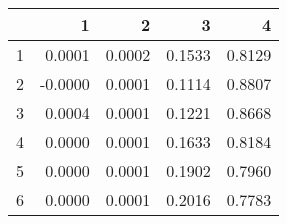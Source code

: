 \begin{table}[ht]
\begin{center}
\begin{tabular}{rrrrr}
  \hline
 & 1 & 2 & 3 & 4 \\ 
  \hline
1 & 0.0001 & 0.0002 & 0.1533 & 0.8129 \\ 
  2 & -0.0000 & 0.0001 & 0.1114 & 0.8807 \\ 
  3 & 0.0004 & 0.0001 & 0.1221 & 0.8668 \\ 
  4 & 0.0000 & 0.0001 & 0.1633 & 0.8184 \\ 
  5 & 0.0000 & 0.0001 & 0.1902 & 0.7960 \\ 
  6 & 0.0000 & 0.0001 & 0.2016 & 0.7783 \\ 
   \hline
\end{tabular}
\end{center}
\end{table}

